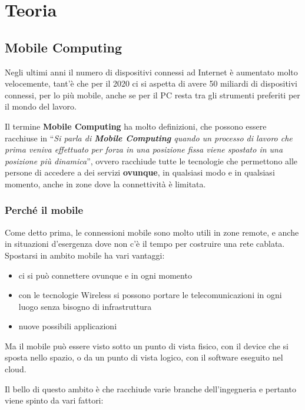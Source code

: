 \part{Teoria}

\chapter{Mobile Computing}
\label{mobile-computing}

Negli ultimi anni il numero di dispositivi connessi ad Internet è
aumentato molto velocemente, tant'è che per il 2020 ci si aspetta di
avere 50 miliardi di dispositivi connessi, per lo più mobile, anche se
per il PC resta tra gli strumenti preferiti per il mondo del lavoro.

Il termine \textbf{Mobile Computing} ha molto definizioni, che possono
essere racchiuse in ``\emph{Si parla di \textbf{Mobile Computing} quando
un processo di lavoro che prima veniva effettuato per forza in una
posizione fissa viene spostato in una posizione più dinamica}'', ovvero
racchiude tutte le tecnologie che permettono alle persone di accedere a
dei servizi \textbf{ovunque}, in qualsiasi modo e in qualsiasi momento, anche
in zone dove la connettività è limitata.

\section{Perché il mobile}

Come detto prima, le connessioni mobile sono molto utili in zone remote, e
anche in situazioni d'esergenza dove non c'è il tempo per costruire una rete
cablata.
Spostarsi in ambito mobile ha vari vantaggi:

\begin{itemize}
\item ci si può connettere ovunque e in ogni momento
\item con le tecnologie Wireless si possono portare le telecomunicazioni in
  ogni luogo senza bisogno di infrastruttura
\item nuove possibili applicazioni
\end{itemize}

Ma il mobile può essere visto sotto un punto di vista fisico, con il
device che si sposta nello spazio, o da un punto di vista logico, con il
software eseguito nel cloud.

Il bello di questo ambito è che racchiude varie branche dell'ingegneria
e pertanto viene spinto da vari fattori:


